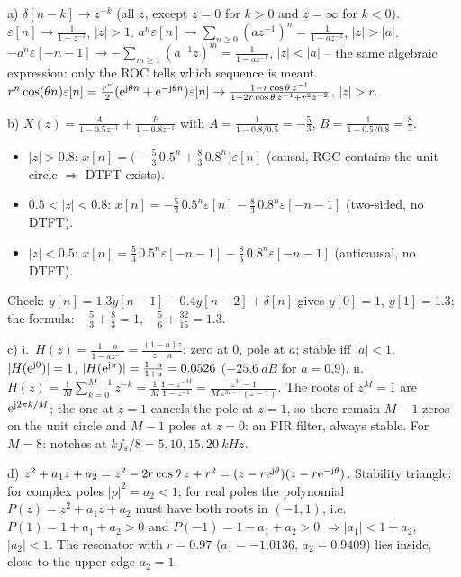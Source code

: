 \begin{solution}
a) $\delta[n-k]\rightarrow z^{-k}$ (all $z$, except $z=0$ for $k>0$ and
$z=\infty$ for $k<0$). $\varepsilon[n]\rightarrow\frac{1}{1-z^{-1}}$, $|z|>1$.
$a^n\varepsilon[n]\rightarrow\sum_{n\ge0}(az^{-1})^n=\frac{1}{1-az^{-1}}$, $|z|>|a|$.
$-a^n\varepsilon[-n-1]\rightarrow-\sum_{m\ge1}(a^{-1}z)^m=\frac{1}{1-az^{-1}}$,
$|z|<|a|$ -- the same algebraic expression: only the ROC tells which sequence is
meant. $r^n\cos(\theta n)\varepsilon[n]=\frac{r^n}2(\mathrm{e}^{\mathrm{j}\theta n}+\mathrm{e}^{-\mathrm{j}\theta n})\varepsilon[n]
\rightarrow\frac{1-r\cos\theta\,z^{-1}}{1-2r\cos\theta\,z^{-1}+r^2z^{-2}}$, $|z|>r$.

b) $X(z)=\frac{A}{1-0.5z^{-1}}+\frac{B}{1-0.8z^{-1}}$ with
$A=\frac{1}{1-0.8/0.5}=-\frac53$, $B=\frac{1}{1-0.5/0.8}=\frac83$.
\begin{itemize}
  \item $|z|>0.8$: $x[n]=\bigl(-\frac53\,0.5^n+\frac83\,0.8^n\bigr)\varepsilon[n]$
    (causal, ROC contains the unit circle $\Rightarrow$ DTFT exists).
  \item $0.5<|z|<0.8$: $x[n]=-\frac53\,0.5^n\varepsilon[n]-\frac83\,0.8^n\varepsilon[-n-1]$
    (two-sided, no DTFT).
  \item $|z|<0.5$: $x[n]=\frac53\,0.5^n\varepsilon[-n-1]-\frac83\,0.8^n\varepsilon[-n-1]$
    (anticausal, no DTFT).
\end{itemize}
Check: $y[n]=1.3y[n-1]-0.4y[n-2]+\delta[n]$ gives $y[0]=1$, $y[1]=1.3$;
the formula: $-\frac53+\frac83=1$, $-\frac56+\frac{32}{15}=1.3$.

c) i.~$H(z)=\frac{1-a}{1-az^{-1}}=\frac{(1-a)z}{z-a}$: zero at 0, pole at $a$;
stable iff $|a|<1$. $|H(\mathrm{e}^{\mathrm{j}0})|=1$, $|H(\mathrm{e}^{\mathrm{j}\pi})|=\frac{1-a}{1+a}=0.0526$
($\SI{-25.6}{dB}$ for $a=0.9$).
ii.~$H(z)=\frac1M\sum_{k=0}^{M-1}z^{-k}=\frac1M\frac{1-z^{-M}}{1-z^{-1}}=\frac{z^M-1}{M\,z^{M-1}(z-1)}$.
The roots of $z^M=1$ are $\mathrm{e}^{\mathrm{j}2\pi k/M}$; the one at $z=1$ cancels the pole at
$z=1$, so there remain $M-1$ zeros on the unit circle and $M-1$ poles at
$z=0$: an FIR filter, always stable. For $M=8$: notches at
$kf_s/8=5,10,15,\SI{20}{kHz}$.

d) $z^2+a_1z+a_2=z^2-2r\cos\theta\,z+r^2=(z-r\mathrm{e}^{\mathrm{j}\theta})(z-r\mathrm{e}^{-\mathrm{j}\theta})$.
Stability triangle: for complex poles $|p|^2=a_2<1$; for real poles the
polynomial $P(z)=z^2+a_1z+a_2$ must have both roots in $(-1,1)$, i.e.\
$P(1)=1+a_1+a_2>0$ and $P(-1)=1-a_1+a_2>0$ $\Rightarrow|a_1|<1+a_2$, $|a_2|<1$.
The resonator with $r=0.97$ ($a_1=-1.0136$, $a_2=0.9409$) lies inside, close
to the upper edge $a_2=1$.


\end{solution}
